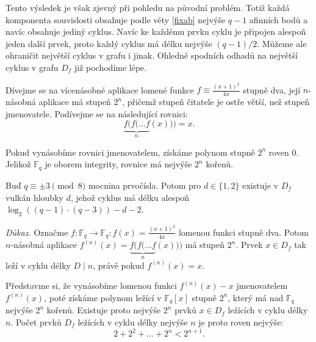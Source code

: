 \documentclass[12pt]{report}
\begin{document}



Tento výsledek je však zjevný při pohledu na původní problém. Totiž každá komponenta souvislosti obsahuje podle věty \ref{fixab} nejvýše $q-1$ afinních bodů a navíc obsahuje jediný cyklus. Navíc ke každému prvku cyklu je připojen alespoň jeden další prvek, proto každý cyklus má délku nejvýše $(q-1)/2$. Můžeme ale ohraničit největší cyklus v grafu i jinak. Ohledně spodních odhadů na největší cyklus v grafu $D_{f}$ již pochodíme lépe.

Dívejme se na vícenásobné aplikace lomené funkce $f \equiv \frac{(x+1)^2}{4x}$ stupně dva, její $n$-násobná aplikace má stupeň $2^n$, přičemž stupeň čitatele je ostře větší, než stupeň jmenovatele. Podívejme se na následující rovnici: $$\underbrace{f(f(\dots f}_{n}(x))) = x.$$

Pokud vynásobíme rovnici jmenovatelem, získáme polynom stupně $2^n$ roven $0$. Jelikož $\mathbb{F}_q$ je oborem integrity, rovnice má nejvýše $2^n$ kořenů. 

\begin{veta}
Buď $q \equiv \pm 3 \pmod{8}$ mocnina prvočísla. Potom pro $d \in \lbrace 1,2 \rbrace$ existuje v $D_f$ vulkán hloubky $d$, jehož cyklus má délku alespoň $\log_2((q-1)\cdot(q-3))-d-2$.
\end{veta}
\noindent \textit{Důkaz.} Označme $f: \mathbb{F}_q \longrightarrow \mathbb{F}_q : f(x) = \frac{(x+1)^2}{4x}$ lomenou funkci stupně dva. Potom $n$-násobná aplikace $f^{(n)} (x) = \underbrace{f(f(\dots f}_{n}(x)))$ má stupeň $2^n$. Prvek $x \in D_f$ tak leží v cyklu délky $D \mid n$, právě pokud $f^{(n)}(x)=x$.

Představme si, že vynásobíme lomenou funkci $f^{(n)}(x)-x$ jmenovatelem $f^{(n)}(x)$, poté získáme polynom ležící v $\mathbb{F}_q [x]$ stupně $2^n$, který má nad $\mathbb{F}_q$ nejvýše $2^n$ kořenů. Existuje proto nejvýše $2^n$ prvků $x \in D_f$ ležících v cyklu délky $n$. Počet prvků $D_f$ ležících v cyklu délky nejvýše $n$ je proto roven nejvýše:
\begin{equation}\label{lol}
2+2^2+\dots+2^n < 2^{n+1}.
\end{equation}
\end{document}
